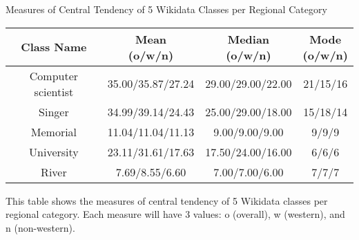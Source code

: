 
\begin{center}
\scriptsize
\begin{threeparttable}
\captionsetup{font=small}
\caption{Measures of Central Tendency of 5 Wikidata Classes per Regional Category}
\label{tab:western - central tendency}
\begin{tabular}{c | c c c} 
\toprule
    Class Name & \CellWithForceBreak{Mean \\ (o/w/n)} & \CellWithForceBreak{Median \\ (o/w/n)} & \CellWithForceBreak{Mode \\ (o/w/n)} \\ [0.5ex] 
\midrule
    Computer scientist & 35.00/35.87/27.24 & 29.00/29.00/22.00 & 21/15/16 \\
    Singer & 34.99/39.14/24.43 & 25.00/29.00/18.00 & 15/18/14 \\
    Memorial & 11.04/11.04/11.13 & 9.00/9.00/9.00 & 9/9/9 \\
    University & 23.11/31.61/17.63 & 17.50/24.00/16.00 & 6/6/6 \\
    River & 7.69/8.55/6.60 & 7.00/7.00/6.00 & 7/7/7 \\
    [1ex]
\bottomrule
\end{tabular}
\begin{tablenotes}
    \scriptsize
    \item{This table shows the measures of central tendency of 5 Wikidata classes per regional category. Each measure will have 3 values: o (overall), w (western), and n (non-western).}
\end{tablenotes}
\end{threeparttable}
\end{center}


